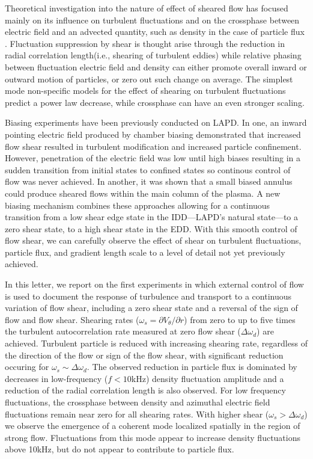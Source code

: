 \documentclass[aps,prl,amsmath,amssymb,preprint,superscriptaddress]{revtex4}
\begin{document}
Theoretical investigation into the nature of effect of sheared flow has focused mainly on its influence on turbulent fluctuations \cite{biglari90} and on the crossphase between electric field and an advected quantity, such as density in the case of particle flux \cite{ware96,terry01}. Fluctuation suppression by shear is thought arise through the reduction in radial correlation length(i.e., shearing of turbulent eddies) while relative phasing between fluctuation electric field and density can either promote overall inward or outward motion of particles, or zero out such change on average. The simplest mode non-specific models for the effect of shearing on turbulent fluctuations predict a power law decrease\cite{biglari90}, while crossphase can have an even stronger scaling\cite{terry01}.

Biasing experiments have been previously conducted on LAPD. In one, an inward pointing electric field produced by chamber biasing demonstrated that increased flow shear resulted in turbulent modification and increased particle confinement\cite{carter09}. However, penetration of the electric field was low until high biases resulting in a sudden transition from initial states to confined states so continous control of flow was never achieved. In another, it was shown that a small biased annulus could produce sheared flows within the main column of the plasma\cite{zhou12}. A new biasing mechanism combines these approaches allowing for a continuous transition from a low shear edge state in the IDD---LAPD's natural state---to a zero shear state, to a high shear state in the EDD. With this smooth control of flow shear, we can carefully observe the effect of shear on turbulent fluctuations, particle flux, and gradient length scale to a level of detail not yet previously achieved.

In this letter, we report on the first experiments in which external
control of flow is used to document the response of turbulence and
transport to a continuous variation of flow shear, including a zero
shear state and a reversal of the sign of flow and flow shear.
Shearing rates ($\omega_{s}= \partial V_{\theta}/\partial r$) from
zero to up to five times the turbulent autocorrelation rate measured
at zero flow shear ($\Delta \omega_{d}$) are achieved. Turbulent
particle is reduced with increasing shearing rate, regardless of the
direction of the flow or sign of the flow shear, with significant
reduction occuring for $\omega_s \sim \Delta \omega_d$.  The observed
reduction in particle flux is dominated by decreases in low-frequency
($f < 10$kHz) density fluctuation amplitude and a reduction of the
radial correlation length is also observed. For low frequency
fluctuations, the crossphase
between density and azimuthal electric field fluctuations remain near
zero for all shearing rates.  With higher shear ($\omega_s > \Delta
\omega_d$) we observe the emergence of a coherent mode localized spatially in the region
of strong flow. Fluctuations from this mode appear to increase density
fluctuations above 10kHz, but do not appear to contribute to particle
flux.   
\end{document}
